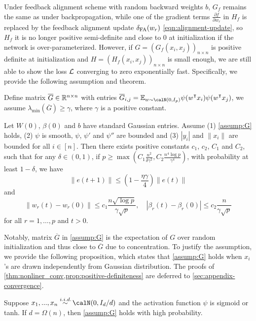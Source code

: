 Under feedback alignment scheme with random backward weights $b$, $G_f$ remains the same as under backpropagation, while one of the gradient terms $\frac{\partial f}{\partial w_r}$ in $H_f$ is replaced by the feedback alignment update $\delta_\mathrm{FA}(w_r)$ \eqref{eqn:alignment-update}, so $H_f$ it is no longer positive semi-definite and close to $0$ at initialization if the network is over-parameterized. However, if $G = (G_f(x_i,x_j))_{n\times n}$ is positive definite at initialization and $H = (H_f(x_i,x_j))_{n\times n}$ is small enough, we are still able to show the loss $\mathcal{L}$ converging to zero exponentially fast. Specifically, we provide the following assumption and theorem.

\begin{assumption}\label{assump:G}
Define matrix $\overline{G} \in \mathbb{R}^{n\times n}$ with entries
$\overline{G}_{i,j} = \E_{w\sim \calN(0,I_p)}\psi(w\transpose x_i) \psi(w\transpose  x_j)$, we assume $\lambda_{\min}(\overline{G}) \geq \gamma$, where $\gamma$ is a positive constant.
\end{assumption}

\begin{theorem}\label{thm:nonliner_conv}
Let $W(0)$, $\beta(0)$ and $b$ have \iid standard Gaussian entries. Assume \textnormal{(1)} \cref{assump:G} holds, \textnormal{(2)} $\psi$ is smooth, $\psi$, $\psi'$ and $\psi''$ are bounded and \textnormal{(3)} $|y_i|$ and $\|x_i\|$ are bounded for all $i\in[n]$. Then there exists positive constants $c_1$, $c_2$, $C_1$ and $C_2$, such that for any $\delta\in(0,1)$, if $p \geq \max(C_1\frac{n^2}{\delta\gamma^2}, C_2\frac{n^4\log p}{\gamma^4})$, with probability at least $1-\delta$, we have
\begin{equation}\label{eq:conv}
    \|e(t+1)\| \leq (1-\frac{\eta\gamma}{4})\|e(t)\|
\end{equation}
and 
\begin{equation}
\label{eq:weights}
    \|w_r(t)-w_r(0)\| \leq c_1\frac{n\sqrt{\log p}}{\gamma\sqrt p}, \quad |\beta_r(t)-\beta_r(0)| \leq c_2\frac{n}{\gamma\sqrt p}
\end{equation}
for all $r=1,\ldots, p$ and $t>0$.
\end{theorem}

Notably, matrix $\overline{G}$ in \cref{assump:G} is the expectation of $G$ over random initialization and thus close to $\overline{G}$ due to concentration. To justify the assumption, we provide the following proposition, which states that \cref{assump:G} holds when $x_i$'s are drawn independently from Gaussian distribution. The proofs of \cref{thm:nonliner_conv,prop:positive-definiteness} are deferred to \cref{sec:appendix-convergence}.

\begin{proposition}\label{prop:positive-definiteness}
Suppose $x_1,...,x_n \overset{\iid}{\sim} \calN(0,I_d/d)$ and the activation function $\psi$ is sigmoid or tanh. If $d=\Omega(n)$, then \cref{assump:G} holds with high probability.
\end{proposition}




